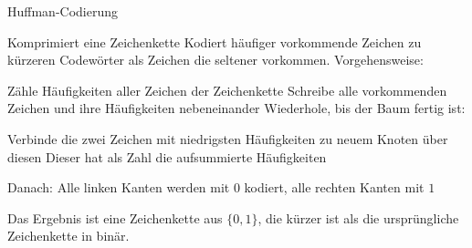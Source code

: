 \documentclass{beamer}
\begin{document}
\begin{frame}{Huffman-Codierung}
	\begin{itemize}
		\pitem Komprimiert eine Zeichenkette
		\pitem Kodiert häufiger vorkommende Zeichen zu kürzeren Codewörter als Zeichen die seltener vorkommen.
		\pitem Vorgehensweise:
		\begin{enumerate}
			\pitem Zähle Häufigkeiten aller Zeichen der Zeichenkette
			\pitem Schreibe alle vorkommenden Zeichen und ihre Häufigkeiten nebeneinander
			\pitem Wiederhole, bis der Baum fertig ist:
			\begin{itemize}
				\pitem Verbinde die zwei Zeichen mit niedrigsten Häufigkeiten zu neuem Knoten über diesen
				\pitem Dieser hat als Zahl die aufsummierte Häufigkeiten
			\end{itemize}
			\pitem Danach: Alle linken Kanten werden mit $0$ kodiert, alle rechten Kanten mit $1$
		\end{enumerate}
	\end{itemize}

	\p Das Ergebnis ist eine Zeichenkette aus $\{0,1\}$\p , die kürzer ist als die ursprüngliche Zeichenkette in binär.
\end{frame}
\end{document}
